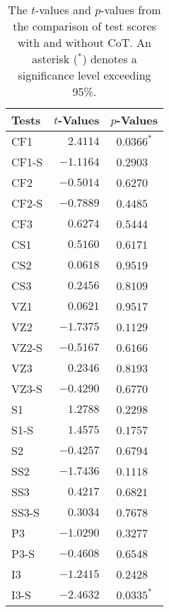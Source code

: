 \begin{table*}[h]
    \centering
    \begin{tabular}{lrl}
    \toprule
    \bf Tests & \bf $t$-Values & \bf $p$-Values \\
    \midrule
    \cellcolor{myblue!34.0} CF1 & $2.4114$ & \ $0.0366^*$ \\
    \cellcolor{myred!34.0} CF1-S & $-1.1164$ & \ $0.2903$ \\
    \cellcolor{myblue!34.0} CF2 & $-0.5014$ & \ $0.6270$ \\
    \cellcolor{myred!34.0} CF2-S & $-0.7889$ & \ $0.4485$ \\
    \cellcolor{myblue!34.0} CF3 & $0.6274$ & \ $0.5444$ \\
    \midrule
    \cellcolor{myblue!34.0} CS1 & $0.5160$ & \ $0.6171$ \\
    \cellcolor{myblue!34.0} CS2 & $0.0618$ & \ $0.9519$ \\
    \cellcolor{myblue!34.0} CS3 & $0.2456$ & \ $0.8109$ \\
    \midrule
    \cellcolor{myblue!34.0} VZ1 & $0.0621$ & \ $0.9517$ \\
    \cellcolor{myblue!34.0} VZ2 & $-1.7375$ & \ $0.1129$ \\
    \cellcolor{myred!34.0} VZ2-S & $-0.5167$ & \ $0.6166$ \\
    \cellcolor{myblue!34.0} VZ3 & $0.2346$ & \ $0.8193$ \\
    \cellcolor{myred!34.0} VZ3-S & $-0.4290$ & \ $0.6770$ \\
    \midrule
    \cellcolor{myblue!34.0} S1 & $1.2788$ & \ $0.2298$ \\
    \cellcolor{myred!34.0} S1-S & $1.4575$ & \ $0.1757$ \\
    \cellcolor{myblue!34.0} S2 & $-0.4257$ & \ $0.6794$ \\
    \midrule
    \cellcolor{myblue!34.0} SS2 & $-1.7436$ & \ $0.1118$ \\
    \cellcolor{myblue!34.0} SS3 & $0.4217$ & \ $0.6821$ \\
    \cellcolor{myred!34.0} SS3-S & $0.3034$ & \ $0.7678$ \\
    \midrule
    \cellcolor{myblue!34.0} P3 & $-1.0290$ & \ $0.3277$ \\
    \cellcolor{myred!34.0} P3-S & $-0.4608$ & \ $0.6548$ \\
    \midrule
    \cellcolor{myblue!34.0} I3 & $-1.2415$ & \ $0.2428$ \\
    \cellcolor{myred!34.0} I3-S & $-2.4632$ & \ $0.0335^*$ \\
    \bottomrule
    \end{tabular}
    \caption{The $t$-values and $p$-values from the comparison of test scores with and without CoT. An asterisk ($^*$) denotes a significance level exceeding 95\%.}
    \label{tab:t-test}
\end{table*}